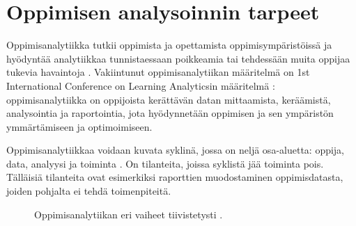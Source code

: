 \chapter{Oppimisen analysoinnin tarpeet\label{oppimisenanalysoinnintarpeet}}

Oppimisanalytiikka tutkii oppimista ja opettamista oppimisympäristöissä ja hyödyntää analytiikkaa tunnistaessaan poikkeamia tai tehdessään muita oppijaa tukevia havaintoja \citep{longPenetratingFogAnalytics2011}. Vakiintunut oppimisanalytiikan määritelmä on 1st International Conference on Learning Analyticsin määritelmä \citep{siemensLearningAnalyticsEmergence2013,clowLearningAnalyticsCycle2012}: oppimisanalytiikka on oppijoista kerättävän datan mittaamista, keräämistä, analysointia ja raportointia, jota hyödynnetään oppimisen ja sen ympäristön ymmärtämiseen ja optimoimiseen.

Oppimisanalytiikkaa voidaan kuvata syklinä, jossa on neljä osa-aluetta: oppija, data, analyysi ja toiminta \citep{clowLearningAnalyticsCycle2012}. On tilanteita, joissa syklistä jää toiminta pois. Tälläisiä tilanteita ovat esimerkiksi raporttien muodostaminen oppimisdatasta, joiden pohjalta ei tehdä toimenpiteitä.

\begin{figure}[h]
    \centering
    \caption{Oppimisanalytiikan eri vaiheet tiivistetysti \citep{clowLearningAnalyticsCycle2012}.}
\end{figure}

